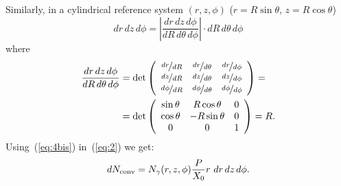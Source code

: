 Similarly, in a cylindrical reference system $(r,z,\phi)$ ($r=R\sin\theta$, $z=R\cos\theta$)
\begin{equation}
 dr\,dz\,d\phi = \left| \frac{dr\, dz\, d\phi}{dR\,d\theta\,d\phi}
   \right| \cdot dR\,d\theta\,d\phi
\label{eq:3bis}
\end{equation}
where
\begin{equation}
\begin{split}
\frac{dr\,dz\,d\phi}{dR\,d\theta\, d\phi}
& = \det \left( \begin{array}{ccc}
\nicefrac{dr}{dR}      & \nicefrac{dr}{d\theta}      & \nicefrac{dr}{d\phi} \\
\nicefrac{dz}{dR}      & \nicefrac{dz}{d\theta}      & \nicefrac{dz}{d\phi} \\
\nicefrac{d\phi}{dR}   & \nicefrac{d\phi}{d\theta}   & \nicefrac{d\phi}{d\phi}
\end{array} \right) = \\
& = \det \left( \begin{array}{ccc}
\sin \theta & R\cos\theta  & 0\\
\cos\theta  & -R\sin\theta & 0 \\
 0 & 0 & 1 
\end{array} \right)
= R .
\end{split}
\label{eq:4bis}
\end{equation}
Using~(\ref{eq:4bis}) in~(\ref{eq:2}) we get:
\begin{equation}
dN_{\rm conv} = N_{\gamma}(r, z, \phi) 
\frac{P}{X_0} r\, \,dr\,dz\,d\phi .
\label{eq:5bis}
\end{equation}

